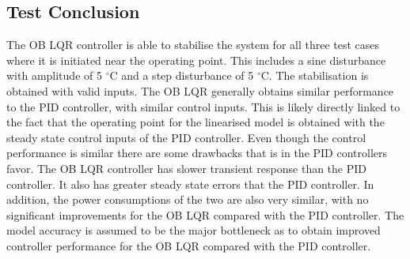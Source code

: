 \subsection{Test Conclusion}
The OB LQR controller is able to stabilise the system for all three test cases where it is initiated near the operating point. This includes a sine disturbance with amplitude of 5 $ ^{\circ} $C and a step disturbance of 5 $ ^{\circ} $C. The stabilisation is obtained with valid inputs. The OB LQR generally obtains similar performance to the PID controller, with similar control inputs. This is likely directly linked to the fact that the operating point for the linearised model is obtained with the steady state control inputs of the PID controller.
Even though the control performance is similar there are some drawbacks that is in the PID controllers favor. The OB LQR controller has slower transient response than the PID controller. It also has greater steady state errors that the PID controller. 
In addition, the power consumptions of the two are also very similar, with no significant improvements for the OB LQR compared with the PID controller.
The model accuracy is assumed to be the major bottleneck as to obtain improved controller performance for the OB LQR compared with the PID controller.
